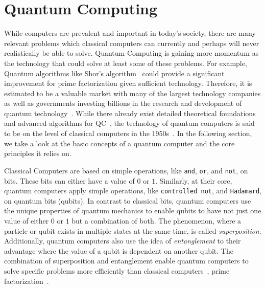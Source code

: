 \newpage
\section{Quantum Computing}
While computers are prevalent and important in today's society, there are many relevant problems which classical computers can currently and perhaps will never realistically be able to solve. Quantum Computing is gaining more momentum as the technology that could solve at least some of these problems. For example, Quantum algorithms like Shor's algorithm~\cite{Shor97} could provide a significant improvement for prime factorization given sufficient technology. Therefore, it is estimated to be a valuable market with many of the largest technology companies as well as governments investing billions in the research and development of quantum technology~\cite{RDB*22}. While there already exist detailed theoretical foundations~\cite{van20, Ying11,YYF12} and advanced algorithms for QC~\cite{ACR*10,BGB*18,LoCh19,Shor97}, the technology of quantum computers is said to be on the level of classical computers in the 1950s~\cite{CFM17}. In the following section, we take a look at the basic concepts of a quantum computer and the core principles it relies on.

Classical Computers are based on simple operations, like \texttt{and}, \texttt{or}, and \texttt{not}, on bits. These bits can either have a value of $0$ or $1$. Similarly, at their core, quantum computers apply simple operations, like \texttt{controlled not}, and \texttt{Hadamard}, on quantum bits (qubits). In contrast to classical bits, quantum computers use the unique properties of quantum mechanics to enable qubits to have not just one value of either $0$ or $1$ but a combination of both. The phenomenon, where a particle or qubit exists in multiple states at the same time, is called \emph{superposition}. Additionally, quantum computers also use the idea of \emph{entanglement} to their advantage where the value of a qubit is dependent on another qubit. The combination of superposition and entanglement enable quantum computers to solve specific problems more efficiently than classical computers~\cite{RDB*22}, \eg prime factorization~\cite{Shor97}.

